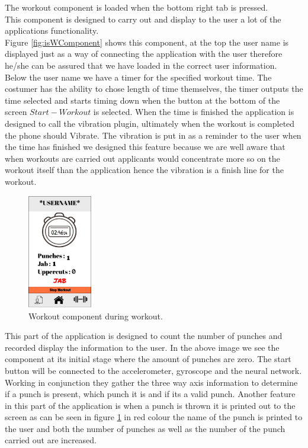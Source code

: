 \documentclass[a4paper,12pt]{report}
\begin{document}
The workout component is loaded when the bottom right tab is pressed.\\
This component is designed to carry out and display to the user a lot of the applications functionality.\\
Figure \ref{fig:isWComponent}  shows this component, at the top the user name is displayed just as a way of connecting the application with the user therefore he/she can be assured that we have loaded in the correct user information.\\
Below the user name we have a timer for the specified workout time. The costumer has the ability to chose length of time themselves, the timer outputs the time selected and starts timing down when the button at the bottom of the screen $Start-Workout$ is selected. When the time is finished the application is designed to call the vibration plugin, ultimately when the workout is completed the phone should Vibrate.
The vibration is put in as a reminder to the user when the time has finished we designed this feature because we are well aware that when workouts are carried out applicants would concentrate more so on the workout itself than the application hence the vibration is a finish line for the workout.
\newpage
\begin{figure}
\centering
\includegraphics[width=0.25\textwidth]{images/workoutAfterPunch.png}
\caption{\label{fig:ipWComponent}Workout component during workout.}
\end{figure}
This part of the application is designed to count the number of punches and recorded display the information to the user. In the above image we see the component at its initial stage where the amount of punches are zero.
The start button will be connected to the accelerometer, gyroscope and the neural network. Working in conjunction they gather the three way axis information to determine if a punch is present, which punch it is and if its a valid punch.
Another feature in this part of the application is when a punch is thrown it is printed out to the screen as can be seen in figure  \ref{fig:ipWComponent} in red colour the name of the punch is printed to the user and both the number of punches as well as the number of the punch carried out are increased.
\end{document}
